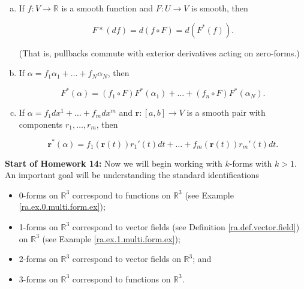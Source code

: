 \begin{proposition}\label{ra.hw.13.p.5}

\begin{enumerate}[(a)]

\item If \(f: V \to \mathbb{R}\) is a smooth function and \(F: U \to V\) is smooth, then

\[
F * (df) = d(f \circ F) = d (F^*(f)).
\]

(That is, pullbacks commute with exterior derivatives acting on zero-forms.)

\item If \(\alpha = f_1 \alpha_1 + \ldots + f_N \alpha_N\), then

\[
F^*(\alpha) = (f_1 \circ F)F^*(\alpha_1) + \ldots + (f_n \circ F)F^*(\alpha_N).
\]

\item If \(\alpha = f_1 dx^1 + \ldots + f_m dx^m\) and \(\boldsymbol{r} : [a,b] \to V\) is a smooth pair with components \(r_1, \ldots, r_m\), then

\[
\boldsymbol{r}^*(\alpha) = f_1 (\boldsymbol{r}(t)) r_1'(t)dt + \ldots + f_m(\boldsymbol{r}(t))r_m'(t) dt.
\]

\end{enumerate}

\end{proposition}


\textbf{Start of Homework 14:} Now we will begin working with \(k\)-forms with \(k >1\). An important goal will be understanding the standard identifications

\begin{itemize}

\item 0-forms on \(\mathbb{R}^3\) correspond to functions on \(\mathbb{R}^3\) (see Example \ref{ra.ex.0.multi.form.ex});

\item 1-forms on \(\mathbb{R}^3\) correspond to vector fields (see Definition \ref{ra.def.vector.field}) on \(\mathbb{R}^3\) (see Example \ref{ra.ex.1.multi.form.ex});

\item 2-forms on \(\mathbb{R}^3\) correspond to vector fields on \(\mathbb{R}^3\); and

\item 3-forms on \(\mathbb{R}^3\) correspond to functions on \(\mathbb{R}^3\).

\end{itemize}

